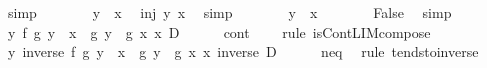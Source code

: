 \begin{isabellebody}
\ simp\isanewline
\ \ \ \ \isamarkupfalse%
\ \isamarkupfalse%
\ {\isachardoublequoteopen}y\ {\isacharequal}{\kern0pt}\ x{\isachardoublequoteclose}\ \isamarkupfalse%
\ inj\ y\ x\ \isamarkupfalse%
\ simp\isanewline
\ \ \ \ \isamarkupfalse%
\ \isamarkupfalse%
\ {\isachardoublequoteopen}y\ {\isasymnoteq}\ x{\isachardoublequoteclose}\isanewline
\ \ \ \ \isamarkupfalse%
\ \isamarkupfalse%
\ False\ \isamarkupfalse%
\ simp\isanewline
\ \ \isamarkupfalse%
\isanewline
\ \ \isamarkupfalse%
\ {\isachardoublequoteopen}{\isacharparenleft}{\kern0pt}{\isasymlambda}y{\isachardot}{\kern0pt}\ {\isacharparenleft}{\kern0pt}f\ {\isacharparenleft}{\kern0pt}g\ y{\isacharparenright}{\kern0pt}\ {\isacharminus}{\kern0pt}\ x{\isacharparenright}{\kern0pt}\ {\isacharslash}{\kern0pt}\ {\isacharparenleft}{\kern0pt}g\ y\ {\isacharminus}{\kern0pt}\ g\ x{\isacharparenright}{\kern0pt}{\isacharparenright}{\kern0pt}\ {\isasymmidarrow}x{\isasymrightarrow}\ D{\isachardoublequoteclose}\isanewline
\ \ \ \ \isamarkupfalse%
\ cont\ {}\ {}\ \isamarkupfalse%
\ {\isacharparenleft}{\kern0pt}rule\ isCont{\isacharunderscore}{\kern0pt}LIM{\isacharunderscore}{\kern0pt}compose{}{\isacharparenright}{\kern0pt}\isanewline
\ \ \isamarkupfalse%
\ \isamarkupfalse%
\ {\isachardoublequoteopen}{\isacharparenleft}{\kern0pt}{\isasymlambda}y{\isachardot}{\kern0pt}\ inverse\ {\isacharparenleft}{\kern0pt}{\isacharparenleft}{\kern0pt}f\ {\isacharparenleft}{\kern0pt}g\ y{\isacharparenright}{\kern0pt}\ {\isacharminus}{\kern0pt}\ x{\isacharparenright}{\kern0pt}\ {\isacharslash}{\kern0pt}\ {\isacharparenleft}{\kern0pt}g\ y\ {\isacharminus}{\kern0pt}\ g\ x{\isacharparenright}{\kern0pt}{\isacharparenright}{\kern0pt}{\isacharparenright}{\kern0pt}\ {\isasymmidarrow}x{\isasymrightarrow}\ inverse\ D{\isachardoublequoteclose}\isanewline
\ \ \ \ \isamarkupfalse%
\ neq\ \isamarkupfalse%
\ {\isacharparenleft}{\kern0pt}rule\ tendsto{\isacharunderscore}{\kern0pt}inverse{\isacharparenright}{\kern0pt}\isanewline
{}\isamarkupfalse%
%
\endisatagproof
{\isafoldproof}%
%
\isadelimproof
%
\endisadelimproof
%
\isadelimdocument
%
\endisadelimdocument
%
\isatagdocument
%
\isamarkuptrue%
%
\endisatagdocument
{\isafolddocument}%
%
\isadelimdocument
%
\endisadelimdocument

\end{isabellebody}
